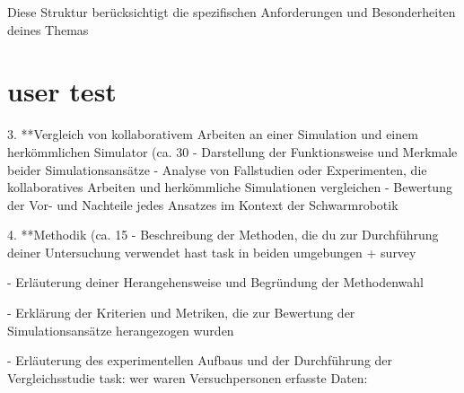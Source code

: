 \documentclass[german,version-2020-11]{uzl-thesis}
\begin{document}
Diese Struktur berücksichtigt die spezifischen Anforderungen und Besonderheiten deines Themas 





\chapter{user test} 
   
   3. **Vergleich von kollaborativem Arbeiten an einer Simulation und einem herkömmlichen Simulator (ca. 30%
      - Darstellung der Funktionsweise und Merkmale beider Simulationsansätze
      - Analyse von Fallstudien oder Experimenten, die kollaboratives Arbeiten und herkömmliche Simulationen vergleichen
      - Bewertung der Vor- und Nachteile jedes Ansatzes im Kontext der Schwarmrobotik
   
   4. **Methodik (ca. 15%
      - Beschreibung der Methoden, die du zur Durchführung deiner Untersuchung verwendet hast
        task in beiden umgebungen + survey
      
        - Erläuterung deiner Herangehensweise und Begründung der Methodenwahl 
      
      - Erklärung der Kriterien und Metriken, die zur Bewertung der Simulationsansätze herangezogen wurden

      - Erläuterung des experimentellen Aufbaus und der Durchführung der Vergleichsstudie
      task:
      wer waren Versuchpersonen
      erfasste Daten:
\end{document}
